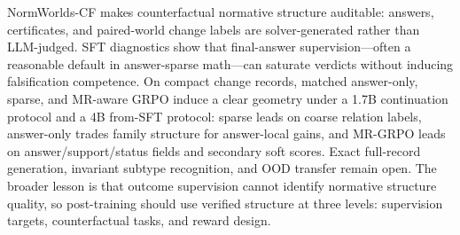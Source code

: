 \documentclass[letterpaper]{article}
\newcommand{\method}{MR-GRPO}
\newcommand{\dataset}{NormWorlds-CF}
\begin{document}
\dataset{} makes counterfactual normative structure auditable: answers, certificates, and paired-world change labels are solver-generated rather than LLM-judged. SFT diagnostics show that final-answer supervision---often a reasonable default in answer-sparse math---can saturate verdicts without inducing falsification competence. On compact change records, matched answer-only, sparse, and MR-aware GRPO induce a clear geometry under a 1.7B continuation protocol and a 4B from-SFT protocol: sparse leads on coarse relation labels, answer-only trades family structure for answer-local gains, and \method{} leads on answer/support/status fields and secondary soft scores. Exact full-record generation, invariant subtype recognition, and OOD transfer remain open. The broader lesson is that outcome supervision cannot identify normative structure quality, so post-training should use verified structure at three levels: supervision targets, counterfactual tasks, and reward design.

\clearpage

\end{document}
